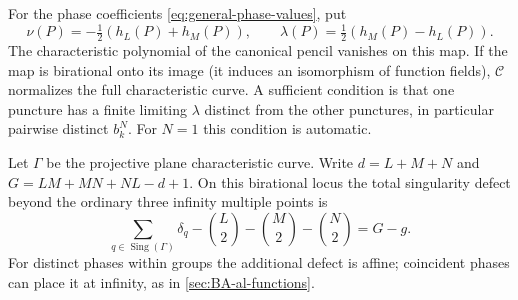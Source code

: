 \begin{proposition}
\label{prop:BA-prescribed-spectral-curve}
For the phase coefficients \cref{eq:general-phase-values}, put
\begin{equation}\label{eq:BA-prescribed-spectral-map}
 \nu(P)=-\tfrac12(h_L(P)+h_M(P)),\qquad
 \lambda(P)=\tfrac12(h_M(P)-h_L(P)).
\end{equation}
The characteristic polynomial of the canonical pencil vanishes on
this map. If the map is birational onto its image (it induces an isomorphism
of function fields), $\mathcal C$ normalizes the full characteristic curve. A sufficient condition is
that one puncture has a finite limiting $\lambda$ distinct from the
other punctures, in particular pairwise distinct $b_k^N$.
For $N=1$ this condition is automatic.

Let $\Gamma$ be the projective plane characteristic curve. Write
$d=L+M+N$ and $G=LM+MN+NL-d+1$. On this birational locus
the total singularity defect beyond the ordinary three infinity
multiple points is
\begin{equation}\label{eq:BA-prescribed-genus-defect}
 \sum_{q\in\operatorname{Sing}(\Gamma)}\delta_q
 -\binom L2-\binom M2-\binom N2=G-g.
\end{equation}
For distinct phases within groups the additional defect is affine;
coincident phases can place it at infinity, as in \cref{sec:BA-al-functions}.
\end{proposition}
